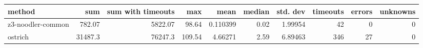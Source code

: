 \begin{tabular}{lrrrrrrrrr}
\hline
 method            &      sum &   sum with timeouts &    max &     mean &   median &   std. dev &   timeouts &   errors &   unknowns \\
\hline
 z3-noodler-common &   782.07 &             5822.07 &  98.64 & 0.110399 &     0.02 &    1.99954 &         42 &        0 &          0 \\
 ostrich           & 31487.3  &            76247.3  & 109.54 & 4.66271  &     2.59 &    6.89463 &        346 &       27 &          0 \\
\hline
\end{tabular}
